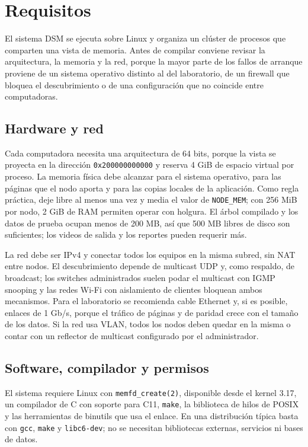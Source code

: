 \section{Requisitos}\label{sec:requisitos}

El sistema DSM se ejecuta sobre Linux y organiza un clúster de procesos que comparten una vista de memoria. Antes de compilar conviene revisar la arquitectura, la memoria y la red, porque la mayor parte de los fallos de arranque proviene de un sistema operativo distinto al del laboratorio, de un firewall que bloquea el descubrimiento o de una configuración que no coincide entre computadoras.

\subsection{Hardware y red}\label{subsec:hardware-red}

Cada computadora necesita una arquitectura de 64 bits, porque la vista se proyecta en la dirección \texttt{0x200000000000} y reserva 4 GiB de espacio virtual por proceso. La memoria física debe alcanzar para el sistema operativo, para las páginas que el nodo aporta y para las copias locales de la aplicación. Como regla práctica, deje libre al menos una vez y media el valor de \texttt{NODE\_MEM}; con 256 MiB por nodo, 2 GiB de RAM permiten operar con holgura. El árbol compilado y los datos de prueba ocupan menos de 200 MB, así que 500 MB libres de disco son suficientes; los videos de salida y los reportes pueden requerir más.

La red debe ser IPv4 y conectar todos los equipos en la misma subred, sin NAT entre nodos. El descubrimiento depende de multicast UDP y, como respaldo, de broadcast; los switches administrados suelen podar el multicast con IGMP snooping y las redes Wi-Fi con aislamiento de clientes bloquean ambos mecanismos. Para el laboratorio se recomienda cable Ethernet y, si es posible, enlaces de 1 Gb/s, porque el tráfico de páginas y de paridad crece con el tamaño de los datos. Si la red usa VLAN, todos los nodos deben quedar en la misma o contar con un reflector de multicast configurado por el administrador.

\subsection{Software, compilador y permisos}\label{subsec:software-permisos}

El sistema requiere Linux con \texttt{memfd\_create(2)}, disponible desde el kernel 3.17, un compilador de C con soporte para C11, \texttt{make}, la biblioteca de hilos de POSIX y las herramientas de binutils que usa el enlace. En una distribución típica basta con \texttt{gcc}, \texttt{make} y \texttt{libc6-dev}; no se necesitan bibliotecas externas, servicios ni bases de datos.

